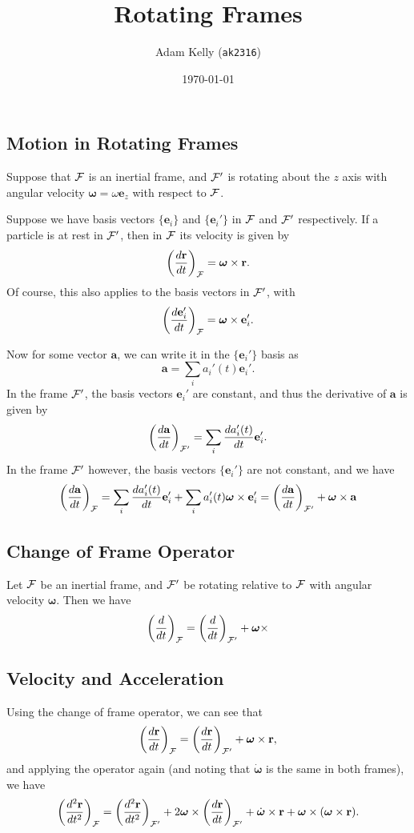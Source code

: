 \documentclass{scrartcl}
\title{Rotating Frames}
\author{Adam Kelly (\texttt{ak2316})}
\date{\today}
\newcommand{\vv}[1]{\boldsymbol{\mathbf{#1}}}
\theoremstyle{definition}
\begin{document}
\maketitle  

\subsection*{Motion in Rotating Frames}

Suppose that $\mathcal{F}$ is an inertial frame, and $\mathcal{F}'$ is rotating about the $z$ axis with angular velocity $\vv \omega = \omega \vv e_z$ with respect to $\mathcal{F}$.

Suppose we have basis vectors $\{\vv e_i\}$ and $\{\vv e_i'\}$ in $\mathcal{F}$ and $\mathcal{F}'$ respectively. If a particle is at rest in $\mathcal{F}'$, then in $\mathcal{F}$ its velocity is given by
	$$
	\left(\frac{d \vv r}{d t}\right)_{\FF} = \vv \omega \times \vv r.
	$$
	Of course, this also applies to the basis vectors in $\mathcal{F}'$, with
	$$
	\left(\frac{d \vv e_i'}{d t}\right)_{\FF} =\vv \omega \times \vv e_i'.
	$$

	Now for some vector $\vv a$, we can write it in the $\{\vv e_i'\}$ basis as
	$$
\vv a = \sum_i a_i'(t) \vv e_i'.
$$
In the frame $\mathcal{F}'$, the basis vectors $\vv e_i'$ are constant, and thus the derivative of $\vv a$ is given by
$$
\left(\frac{d \vv a}{d t}\right)_{\FF'} = \sum_i \frac{d a_i'(t)}{dt} \vv{e}_i'.
$$
In the frame $\mathcal{F}'$ however, the basis vectors $\{\vv e_i'\}$ are not constant, and we have
$$
\left(\frac{d \vv a}{d t}\right)_{\FF} = \sum_i \frac{d a_i'(t)}{dt} \vv{e}_i' + \sum_i a_i'(t) \vv \omega \times \vv e_i' = \left(\frac{d \vv a}{d t}\right)_{\FF'} +\vv \omega \times \vv a
$$

\subsection*{Change of Frame Operator}

Let $\mathcal{F}$ be an inertial frame, and $\mathcal{F}'$ be rotating relative to $\mathcal{F}$ with angular velocity $\vv \omega$.
Then we have
$$
\left(\frac{d}{d t}\right)_{\FF} = \left(\frac{d}{d t}\right)_{\FF'} +\vv \omega \times 
$$

\subsection*{Velocity and Acceleration}

Using the change of frame operator, we can see that
$$
\left(\frac{d \vv r}{d t}\right)_{\FF} = \left(\frac{d \vv r}{d t}\right)_{\FF'} +\vv \omega \times \vv r,
$$
and applying the operator again (and noting that $\dot{\vv \omega}$ is the same in both frames), we have
$$
\left(\frac{d^2 \vv r}{d t^2}\right)_{\FF} = \left(\frac{d^2 \vv r}{d t^2}\right)_{\FF'} + 2 \vv \omega \times \left(\frac{d \vv r}{d t}\right)_{\FF'} + \dot{\vv \omega} \times \vv r + \vv \omega \times (\vv \omega \times \vv r).
$$
\end{document}
